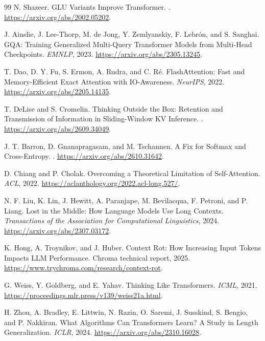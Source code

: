 \documentclass[11pt,twoside]{article}
\theoremstyle{plain}
\theoremstyle{definition}
\theoremstyle{remark}
\begin{document}
\begin{thebibliography}{99}
N. Shazeer.
\newblock GLU Variants Improve Transformer.
.
\newblock \url{https://arxiv.org/abs/2002.05202}.

J. Ainslie, J. Lee-Thorp, M. de Jong, Y. Zemlyanskiy, F. Lebr\'on,
and S. Sanghai.
\newblock GQA: Training Generalized Multi-Query Transformer Models from
Multi-Head Checkpoints.
\newblock \emph{EMNLP}, 2023.
\newblock \url{https://arxiv.org/abs/2305.13245}.

T. Dao, D. Y. Fu, S. Ermon, A. Rudra, and C. R\'e.
\newblock FlashAttention: Fast and Memory-Efficient Exact Attention with
IO-Awareness.
\newblock \emph{NeurIPS}, 2022.
\newblock \url{https://arxiv.org/abs/2205.14135}.

T. DeLise and S. Cromelin.
\newblock Thinking Outside the Box: Retention and Transmission of Information
in Sliding-Window KV Inference.
.
\newblock \url{https://arxiv.org/abs/2609.34049}.

J. T. Barron, D. Gnanapragasam, and M. Tschannen.
\newblock A Fix for Softmax and Cross-Entropy.
.
\newblock \url{https://arxiv.org/abs/2610.31642}.

D. Chiang and P. Cholak.
\newblock Overcoming a Theoretical Limitation of Self-Attention.
\newblock \emph{ACL}, 2022.
\newblock \url{https://aclanthology.org/2022.acl-long.527/}.

N. F. Liu, K. Lin, J. Hewitt, A. Paranjape, M. Bevilacqua, F. Petroni,
and P. Liang.
\newblock Lost in the Middle: How Language Models Use Long Contexts.
\newblock \emph{Transactions of the Association for Computational
Linguistics}, 2024.
\newblock \url{https://arxiv.org/abs/2307.03172}.

K. Hong, A. Troynikov, and J. Huber.
\newblock Context Rot: How Increasing Input Tokens Impacts LLM Performance.
\newblock Chroma technical report, 2025.
\newblock \url{https://www.trychroma.com/research/context-rot}.

G. Weiss, Y. Goldberg, and E. Yahav.
\newblock Thinking Like Transformers.
\newblock \emph{ICML}, 2021.
\newblock \url{https://proceedings.mlr.press/v139/weiss21a.html}.

H. Zhou, A. Bradley, E. Littwin, N. Razin, O. Saremi, J. Susskind,
S. Bengio, and P. Nakkiran.
\newblock What Algorithms Can Transformers Learn? A Study in Length
Generalization.
\newblock \emph{ICLR}, 2024.
\newblock \url{https://arxiv.org/abs/2310.16028}.
\end{thebibliography}
\end{document}
